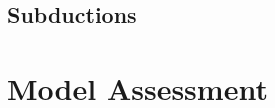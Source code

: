 \documentclass[extra,mreferee]{gji}
\begin{document}


\subsection{Subductions}

\section{Model Assessment}
\end{document}
